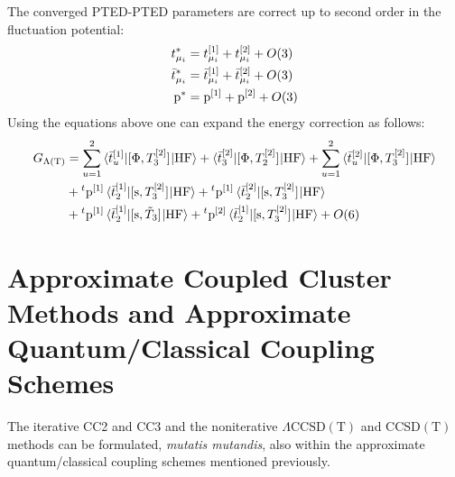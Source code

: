 The converged \acrshort{PTED}-\acrshort{PTED} parameters are correct up
to second order in the fluctuation potential:
\begin{subequations}
  \begin{align}
    t_{\mu_i}^{*} &= t_{\mu_i}^{[1]} + t_{\mu_i}^{[2]} + O(3)
    \label{eq:tamp-star} \\
    \bar{t}_{\mu_i}^{*} &= \bar{t}_{\mu_i}^{[1]} + \bar{t}_{\mu_i}^{[2]} + O(3)
    \label{eq:tbar-star} \\
    \mathrm{p}^{*} &= \mathrm{p}^{[1]} + \mathrm{p}^{[2]} + O(3)
    \label{eq:p-star}
  \end{align}
\end{subequations}
Using the equations above one can expand the energy correction as
follows:
\begin{equation}
  \begin{aligned}
  G_{\Lambda(\text{T})} &=
  \sum_{u=1}^2 \braket{\bar{t}_{u}^{[1]} | [ \Phi, T_3^{[2]} ]^{} | \mathrm{HF}}
  +
  \braket{\bar{t}_{3}^{[2]} | [ \Phi, T_2^{[2]} ]^{} | \mathrm{HF}}
  +
  \sum_{u=1}^2 \braket{\bar{t}_{u}^{[2]} | [ \Phi, T_3^{[2]} ]^{} | \mathrm{HF}}
  \\
  &+
  {}^t\mathrm{p}^{[1]} \braket{\bar{t}_{2}^{[1]} | [ \mathrm{s}, T_3^{[2]} ]^{} | \mathrm{HF}}
  +
  {}^t\mathrm{p}^{[1]} \braket{\bar{t}_{2}^{[2]} | [ \mathrm{s}, T_3^{[2]} ]^{} | \mathrm{HF}}
   \\
  &+
  {}^t\mathrm{p}^{[1]} \braket{\bar{t}_{2}^{[1]} | [ \mathrm{s}, \tilde{T}_3 ]^{} | \mathrm{HF}}
  +
  {}^t\mathrm{p}^{[2]} \braket{\bar{t}_{2}^{[1]} | [ \mathrm{s}, T_3^{[2]} ]^{} | \mathrm{HF}}
  + O(6)
  \end{aligned}
\end{equation}

\section[Approximate CC and Approximate Couplings]{Approximate Coupled Cluster Methods and Approximate
Quantum/Classical Coupling Schemes}\label{sec:approximate-everything}

The iterative \acrshort{CC2} and \acrshort{CC3} and the noniterative
$\Lambda\text{CCSD}(\text{T})$ and $\text{CCSD}(\text{T})$ methods can
be formulated, \emph{mutatis mutandis}, also within the approximate
quantum/classical coupling schemes mentioned previously.\autocite{Caricato2011-tx, Schwabe2012-cf, Krause2016-ee}


